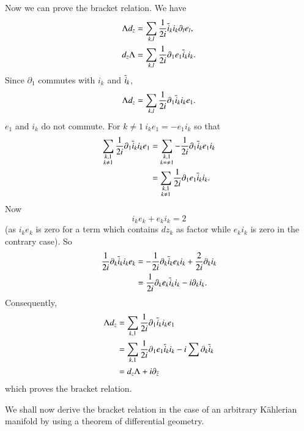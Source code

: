 Now we can prove the bracket relation. We have
\begin{align*}
\Lambda d_{z} &=
\sum_{k,l}\frac{1}{2i}\overline{i}_{k}i_{k}\partial_{l}e_{l},\\
d_{z}\Lambda &= \sum_{k,l}\frac{1}{2i}\partial_{1}e_{1}\overline{i}_{k}i_{k}.
\end{align*}
Since $\partial_{1}$ commutes with $i_{k}$ and $\overline{i}_{k}$,
$$
\Lambda d_{z}=\sum_{k,l}\frac{1}{2i}\partial_{1}\overline{i}_{k}i_{k}e_{1}.
$$
$e_{1}$ and $i_{k}$ do not commute. For $k\neq
1\ i_{k}e_{1}=-e_{1}i_{k}$ so that
\begin{align*}
\sum_{\substack{k,1\\ k\neq
    1}}\frac{1}{2i}\partial_{1}\overline{i}_{k}i_{k}e_{1} &=
\sum_{\substack{k,1\\ k=\neq
    1}}-\frac{1}{2i}\partial_{1}\overline{i}_{k}e_{1}i_{k}\\
&= \sum_{\substack{k,1\\ k\neq
    1}}\frac{1}{2i}\partial_{1}e_{1}\overline{i}_{k}i_{k}. 
\end{align*}
Now\pageoriginale
$$
i_{k}e_{k}+e_{k}i_{k}=2
$$
(as $i_{k}e_{k}$ is zero for a term which contains $dz_{k}$ as factor
while $e_{k}i_{k}$ is zero in the contrary case). So
\begin{align*}
\frac{1}{2i}\partial_{k}\overline{i}_{k}i_{k}e_{k} &=
-\frac{1}{2i}\partial_{k}\overline{i}_{k}e_{k}i_{k}+\frac{2}{2i}\partial_{k}i_{k}\\
&= \frac{1}{2i}\partial_{k}e_{k}\overline{i}_{k}i_{k}-i\partial_{k}i_{k}.
\end{align*}
Consequently,
\begin{align*}
\Lambda d_{z} &=
\sum_{k,1}\frac{1}{2i}\partial_{1}\overline{i}_{k}i_{k}e_{1}\\
&=
\sum_{k,1}\frac{1}{2i}\partial_{1}e_{1}\overline{i}_{k}i_{k}-i\sum\partial_{k}\overline{i}_{k}\\
&= d_{z}\Lambda+i\partial_{\overline{z}}
\end{align*}
which proves the bracket relation.

We shall now derive the bracket relation in the case of an arbitrary
K\"ahlerian manifold by using a theorem of differential geometry.

